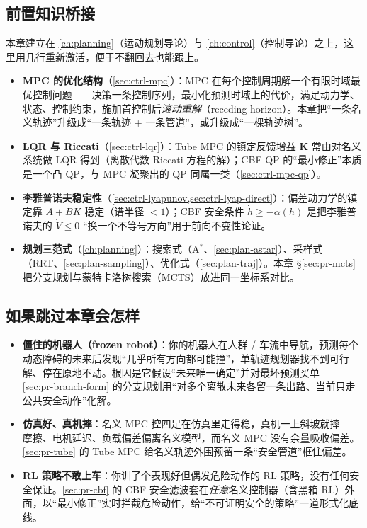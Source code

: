 \subsection*{前置知识桥接}
本章建立在 \cref{ch:planning}（运动规划导论）与 \cref{ch:control}（控制导论）之上，这里用几行重新激活，便于不翻回去也能跟上。
\begin{itemize}
  \item \textbf{MPC 的优化结构}（\cref{sec:ctrl-mpc}）：MPC 在每个控制周期解一个有限时域最优控制问题——决策一条控制序列，最小化预测时域上的代价，满足动力学、状态、控制约束，施加首控制后\emph{滚动重解}（receding horizon）。本章把“一条名义轨迹”升级成“一条轨迹 + 一条管道”，或升级成“一棵轨迹树”。
  \item \textbf{LQR 与 Riccati}（\cref{sec:ctrl-lqr}）：Tube MPC 的镇定反馈增益 $\mathbf{K}$ 常由对名义系统做 LQR 得到（离散代数 Riccati 方程的解）；CBF-QP 的“最小修正”本质是一个凸 QP，与 MPC 凝聚出的 QP 同属一类（\cref{sec:ctrl-mpc-qp}）。
  \item \textbf{李雅普诺夫稳定性}（\cref{sec:ctrl-lyapunov,sec:ctrl-lyap-direct}）：偏差动力学的镇定靠 $A+BK$ 稳定（谱半径 $<1$）；CBF 安全条件 $\dot h\ge-\alpha(h)$ 是把李雅普诺夫的 $\dot V\le 0$ “换一个不等号方向”用于前向不变性论证。
  \item \textbf{规划三范式}（\cref{ch:planning}）：搜索式（A$^*$、\cref{sec:plan-astar}）、采样式（RRT、\cref{sec:plan-sampling}）、优化式（\cref{sec:plan-traj}）。本章 §\ref{sec:pr-mcts} 把分支规划与蒙特卡洛树搜索（MCTS）放进同一坐标系对比。
\end{itemize}

\subsection*{如果跳过本章会怎样}
\begin{itemize}
  \item \textbf{僵住的机器人（frozen robot）}：你的机器人在人群 / 车流中导航，预测每个动态障碍的未来后发现“几乎所有方向都可能撞”，单轨迹规划器找不到可行解、停在原地不动。根因是它假设“未来唯一确定”并对最坏预测买单——\cref{sec:pr-branch-form} 的分支规划用“对多个离散未来各留一条出路、当前只走公共安全动作”化解。
  \item \textbf{仿真好、真机摔}：名义 MPC 控四足在仿真里走得稳，真机一上斜坡就摔——摩擦、电机延迟、负载偏差偏离名义模型，而名义 MPC 没有余量吸收偏差。\cref{sec:pr-tube} 的 Tube MPC 给名义轨迹外围预留一条“安全管道”框住偏差。
  \item \textbf{RL 策略不敢上车}：你训了个表现好但偶发危险动作的 RL 策略，没有任何安全保证。\cref{sec:pr-cbf} 的 CBF 安全滤波套在\emph{任意}名义控制器（含黑箱 RL）外面，以“最小修正”实时拦截危险动作，给“不可证明安全的策略”一道形式化底线。
\end{itemize}

